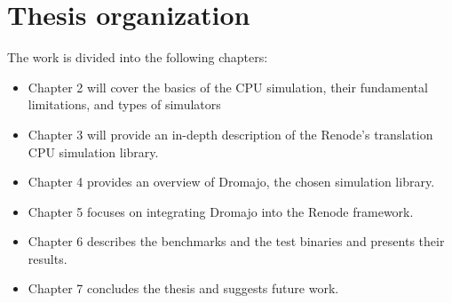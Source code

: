 \section{Thesis organization}

The work is divided into the following chapters:
\begin{itemize}
	\item{Chapter 2 will cover the basics of the CPU simulation, their fundamental limitations, and types of simulators}
	\item{Chapter 3 will provide an in-depth description of the Renode's translation CPU simulation library}.
	\item{Chapter 4 provides an overview of Dromajo, the chosen simulation library}.
	\item{Chapter 5 focuses on integrating Dromajo into the Renode framework}.
	\item{Chapter 6 describes the benchmarks and the test binaries and presents their results}.
	\item{Chapter 7 concludes the thesis and suggests future work}.
\end{itemize}